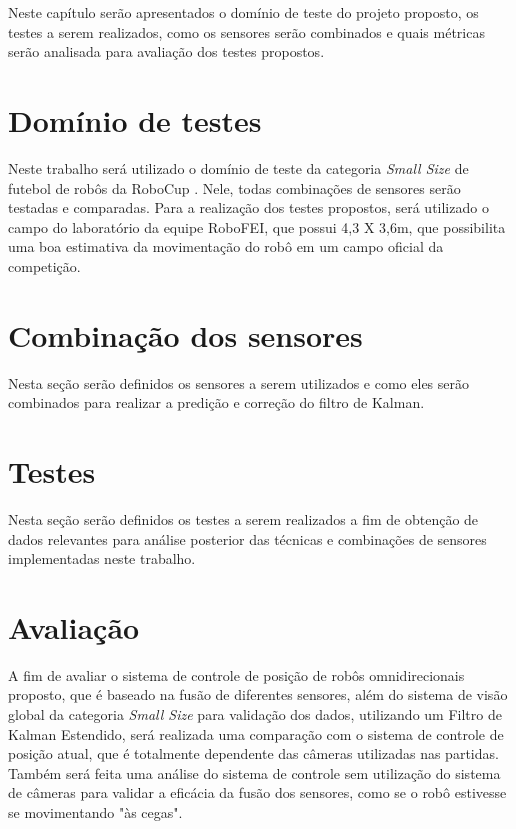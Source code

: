 \documentclass[acronym, symbols]{fei}
\begin{document}
	Neste capítulo serão apresentados o domínio de teste do projeto proposto, os testes a serem realizados, como os sensores serão combinados e quais métricas serão analisada para avaliação dos testes propostos.
	
	\section{Domínio de testes}
	
		Neste trabalho será utilizado o domínio de teste da categoria \textit{Small Size} de futebol de robôs da RoboCup \cite{RoboCup}. Nele, todas combinações de sensores serão testadas e comparadas. Para a realização dos testes propostos, será utilizado o campo do laboratório da equipe RoboFEI, que possui 4,3 X 3,6m, que possibilita uma boa estimativa da movimentação do robô em um campo oficial da competição.
	
	\section{Combinação dos sensores}
	
		Nesta seção serão definidos os sensores a serem utilizados e como eles serão combinados para realizar a predição e correção do filtro de Kalman.
	
	\section{Testes}
	
		Nesta seção serão definidos os testes a serem realizados a fim de obtenção de dados relevantes para análise posterior das técnicas e combinações de sensores implementadas neste trabalho.
	
	\section{Avaliação}

		A fim de avaliar o sistema de controle de posição de robôs omnidirecionais proposto, que é baseado na fusão de diferentes sensores, além do sistema de visão global da categoria \textit{Small Size} para validação dos dados, utilizando um Filtro de Kalman Estendido, será realizada uma comparação com o sistema de controle de posição atual, que é totalmente dependente das câmeras utilizadas nas partidas. Também será feita uma análise do sistema de controle sem utilização do sistema de câmeras para validar a eficácia da fusão dos sensores, como se o robô estivesse se movimentando "às cegas".
		
\end{document}
